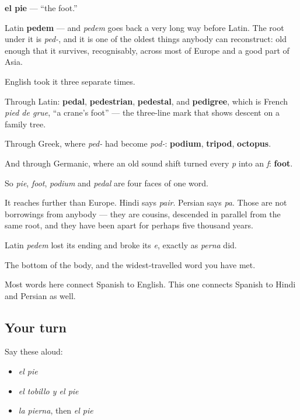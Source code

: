\begin{cousinweb}
\textbf{el pie} — \textquotedblleft{}the foot.\textquotedblright{}

Latin \textbf{pedem} — and \emph{pedem} goes back a very long way before Latin. The root under it is \emph{ped-}, and it is one of the oldest things anybody can reconstruct: old enough that it survives, recognisably, across most of Europe and a good part of Asia.

English took it three separate times.

Through Latin: \textbf{pedal}, \textbf{pedestrian}, \textbf{pedestal}, and \textbf{pedigree}, which is French \emph{pied de grue}, \textquotedblleft{}a crane's foot\textquotedblright{} — the three-line mark that shows descent on a family tree.

Through Greek, where \emph{ped-} had become \emph{pod-}: \textbf{podium}, \textbf{tripod}, \textbf{octopus}.

And through Germanic, where an old sound shift turned every \emph{p} into an \emph{f}: \textbf{foot}.

So \emph{pie}, \emph{foot}, \emph{podium} and \emph{pedal} are four faces of one word.

It reaches further than Europe. Hindi says \emph{pair}. Persian says \emph{pa}. Those are not borrowings from anybody — they are cousins, descended in parallel from the same root, and they have been apart for perhaps five thousand years.

Latin \emph{pedem} lost its ending and broke its \emph{e}, exactly as \emph{perna} did.
\end{cousinweb}

\begin{grammarlens}[title={What you've built}]
The bottom of the body, and the widest-travelled word you have met.

Most words here connect Spanish to English. This one connects Spanish to Hindi and Persian as well.
\end{grammarlens}

\subsection*{Your turn}
Say these aloud:

\begin{itemize}
\raggedright
  \item \emph{el pie}
  \item \emph{el tobillo y el pie}
  \item \emph{la pierna}, then \emph{el pie}
\end{itemize}

